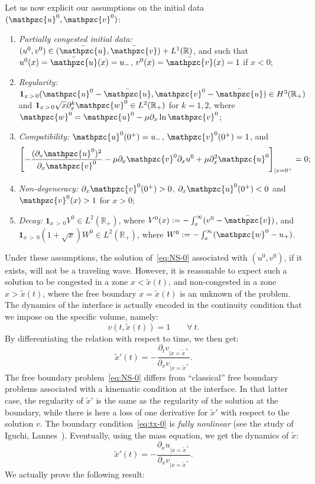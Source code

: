 \documentclass[AHL,Unicode,longabstracts,published]{cedram}
\newcommand{\R}{\mathbb{R}}
\newcommand{\p}{\partial}
\newcommand{\bv}{\bar{\mathpzc{v}}}
\newcommand{\bu}{\bar{\mathpzc{u}}}
\newcommand{\bfun}{\mathbf{1}}
\newcommand{\tv}{\mathpzc{v}}
\newcommand{\tu}{\mathpzc{u}}
\newcommand{\tw}{\mathpzc{w}}
\newcommand{\tx}{\widetilde{x}}
\newcommand*{\Henumi}{\renewcommand*{\theenumi}{H\arabic{enumi}}}
\let\oldforall\forall
\renewcommand*{\forall}{\mathrel{\oldforall}}
\newcommand{\tx}{\widetilde{x}}
\begin{document}
Let us now explicit our assumptions on the initial data~$(\tu^0, \tv^0)$:
\begin{enumerate}\Henumi
\item\label{H1} \emph{Partially congested initial data: }$(u^0, v^0)\in (\bu, \bv) + L^1(\R)$, and such that $u^0(x)=\bu(x)=u_-$, $v^0(x)=\bv(x)=1$ if $x<0$;

\item\label{H2} \emph{Regularity: }$\bfun_{x\,>\,0}(\tu^0-\bu, \tv^0-\bu)\in H^3(\R_+)$ and $\bfun_{x\,>\,0} \sqrt{x}\p_x^k \tw^0\in L^2(\R_+) $ for $k=1,2$, where $\tw^0 = \tu^0-\mu \p_x \ln \tv^0$;

\item\label{H3} \emph{Compatibility:} $\tu^0(0^+)=u_-$, $\tv^0(0^+)=1$, and
\begin{equation}
\left[-\frac{(\p_x \tu^0)^2}{\p_x \tv^0} - \mu \p_x \tv^0 \p_x u^0 + \mu \p_x^2 \tu^0\right]_{|x=0^+}=0;
\end{equation}

\item{\label{item:no-deg}} \emph{Non-degeneracy:} $\p_x \tv^0(0^+)>0$, $\p_x \tu^0(0^+)<0$ and $\tv^0(x)>1$ for $x>0$;

\item\label{H5} \emph{Decay: }$\bfun_{x\,>\,0}V^0\in L^2(\R_+)$, where $V^0(x):=-\int_x^\infty (v^0-\bv)$, and $\bfun_{x\,>\,0} (1+ \sqrt{x}) W^0 \in L^2(\R_+) $, where $W^0:=-\int_x^\infty (\tw^0-u_+)$.
\end{enumerate}



Under these assumptions, the solution of~\eqref{eq:NS-0} associated with $(u^0, v^0)$, if it exists, will not be a traveling wave. However, it is reasonable to expect such a solution to be congested in a zone $x<\tx(t)$, and non-congested in a zone $x>\tx(t)$, where the free boundary $x=\tx(t)$ is an unknown of the problem. The dynamics of the interface is actually encoded in the continuity condition that we impose on the specific volume, namely:
\begin{equation}\label{eq:cont-v-i}
v(t, \tx(t)) = 1 \qquad \forall\ t.
\end{equation}
By differentiating the relation with respect to time, we then get:
\begin{equation}\label{eq:tx-0}
\tx'(t) = - \dfrac{\partial_t v_{|x=\tx^+}}{\partial_x v_{|x=\tx^+}}.
\end{equation}
The free boundary problem~\eqref{eq:NS-0} differs from ``classical'' free boundary problems associated with a kinematic condition at the interface. In that latter case, the regularity of $\tx'$ is the same as the regularity of the solution at the boundary, while there is here a loss of one derivative for $\tx'$ with respect to the solution $v$. The boundary condition~\eqref{eq:tx-0} is \emph{fully nonlinear} (see the study of Iguchi, Lannes~\cite{iguchi2019}). Eventually, using the mass equation, we get the dynamics of $\tx$:
\begin{equation}\label{EDO-2}
\tx'(t) = - \frac{\p_x u_{|x=\tx^+}}{\p_x v_{|x=\tx^+}}.
\end{equation}
We actually prove the following result:
\end{document}
